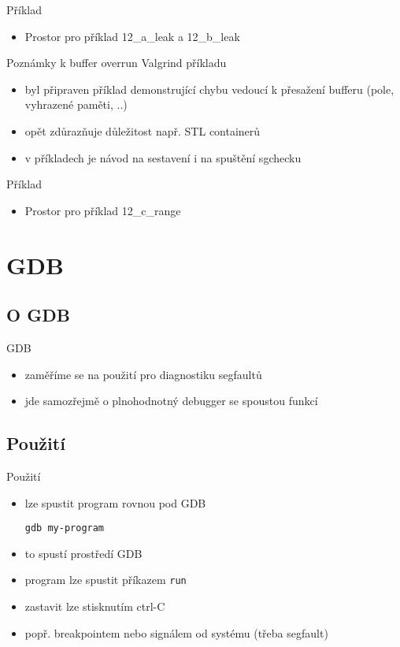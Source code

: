 \documentclass{beamer}
\begin{document}
\begin{xframe}{Příklad}
	\begin{itemize}
		\item Prostor pro příklad 12\_a\_leak a 12\_b\_leak
	\end{itemize}
\end{xframe}

\begin{xframe}{Poznámky k buffer overrun Valgrind příkladu}
	\begin{itemize}
		\item byl připraven příklad demonstrující chybu vedoucí k přesažení bufferu (pole, vyhrazené paměti, ..)
		\item opět zdůrazňuje důležitost např. STL containerů
		\item v příkladech je návod na sestavení i na spuštění sgchecku
	\end{itemize}
\end{xframe}

\begin{xframe}{Příklad}
	\begin{itemize}
		\item Prostor pro příklad 12\_c\_range
	\end{itemize}
\end{xframe}

\section{GDB}
\subsection{O GDB}

\begin{xframe}{GDB}
	\begin{itemize}
		\item zaměříme se na použití pro diagnostiku segfaultů
		\item jde samozřejmě o plnohodnotný debugger se spoustou funkcí
	\end{itemize}
\end{xframe}

\subsection{Použití}

\begin{xframe}{Použití}
	\begin{itemize}
		\item lze spustit program rovnou pod GDB
\begin{lstlisting}[basicstyle=\fontsize{8}{9}\selectfont\ttfamily]
gdb my-program
\end{lstlisting}
		\item to spustí prostředí GDB
		\item program lze spustit příkazem \texttt{run}
		\item zastavit lze stisknutím ctrl-C
		\item popř. breakpointem nebo signálem od systému (třeba segfault)
	\end{itemize}
\end{xframe}
\end{document}
